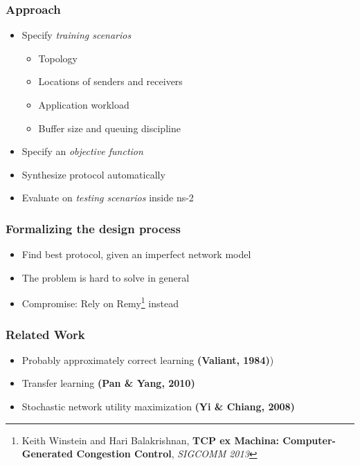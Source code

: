 \documentclass[svgnames]{beamer}
\begin{document}
\begin{Large}
\begin{frame}
\frametitle{Approach}
\begin{itemize}
\item Specify \textit{training scenarios}
\begin{itemize}
\item Topology
\item Locations of senders and receivers
\item Application workload
\item Buffer size and queuing discipline 
\end{itemize}
\item Specify an \textit{objective function}
\item Synthesize protocol automatically
\item Evaluate on \textit{testing scenarios} inside ns-2
\end{itemize}
\end{frame}

\begin{frame}
\frametitle{Formalizing the design process}
\begin{itemize}
\item Find best protocol, given an imperfect network model
\item The problem is hard to solve in general
\item<2-> Compromise: Rely on Remy\footnote<2->{Keith Winstein and Hari Balakrishnan, \textbf{TCP ex Machina: Computer-Generated Congestion Control}, \textit{SIGCOMM 2013}} instead
\end{itemize}
\end{frame}













\begin{frame}
\frametitle{Related Work}
\begin{itemize}
\item Probably approximately correct learning \textbf{(Valiant, 1984)})
\item Transfer learning \textbf{(Pan \& Yang, 2010)}
\item Stochastic network utility maximization \textbf{(Yi \& Chiang, 2008)}
\end{itemize}
\end{frame}


\end{Large}
\end{document}
